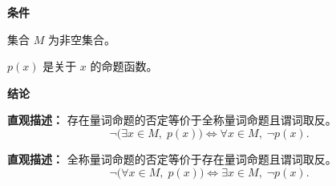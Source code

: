 \begin{statementbox}
	\textbf{\textcolor{CStatement}{条件}}
	\begin{description}[style=nextline, leftmargin=2.8em, labelsep=0.5em, itemsep=0.35em]
		\item[\textbf{\textcolor{CStatement}{条件1（集合非空）：}}]
			集合 $M$ 为非空集合。
		\item[\textbf{\textcolor{CStatement}{条件2（命题定义）：}}]
			$p(x)$ 是关于 $x$ 的命题函数。
	\end{description}
	\par

	\medskip
	\textbf{\textcolor{CStatement}{结论}}
	\begin{description}[style=nextline, leftmargin=2.8em, labelsep=0.5em, itemsep=0.45em]
		\item[\textbf{\textcolor{CStatement}{结论一（量词否定规则）：}}]
			\textbf{\textcolor{CStatement}{直观描述：}}
			存在量词命题的否定等价于全称量词命题且谓词取反。
			\[
				\neg \big( \exists x \in M ,\; p(x) \big) \iff \forall x \in M ,\; \neg p(x).
			\]
		\item[\textbf{\textcolor{CStatement}{推广结论（全称量词否定）：}}]
			\textbf{\textcolor{CStatement}{直观描述：}}
			全称量词命题的否定等价于存在量词命题且谓词取反。
			\[
				\neg \big( \forall x \in M ,\; p(x) \big) \iff \exists x \in M ,\; \neg p(x).
			\]
	\end{description}

\end{statementbox}
